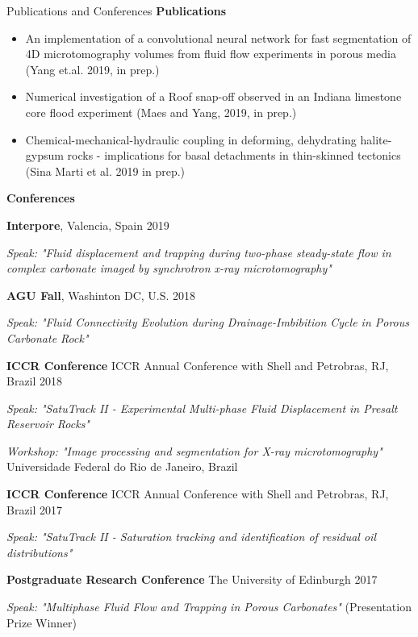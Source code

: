 \documentclass{resume} %
\newenvironment{indentpar}[1]%
  {\begin{list}{}%
          {\setlength{\leftmargin}{#1}}%
          \item[]%
  }
  {\end{list}}
\begin{document}
\begin{rSection}{Publications and Conferences}
\textbf{Publications}
\begin{indentpar}{0.5cm}
\begin{itemize}
    \item An implementation of a convolutional neural network for fast segmentation of 4D microtomography volumes from fluid flow experiments in porous media (Yang et.al. 2019, in prep.)
    \item Numerical investigation of a Roof snap-off observed in an Indiana limestone core flood experiment (Maes and Yang, 2019, in prep.)
    \item Chemical-mechanical-hydraulic coupling in deforming, dehydrating halite-gypsum rocks - implications for basal detachments in thin-skinned tectonics (Sina Marti et al. 2019 in prep.)
\end{itemize}
\end{indentpar}

\textbf{Conferences}
\begin{indentpar}{0.5cm}
\textbf{Interpore}, Valencia, Spain \hfill {2019}
\begin{indentpar}{0.5cm}
\textit {Speak: "Fluid displacement and trapping during two-phase steady-state flow in complex carbonate imaged by synchrotron x-ray microtomography"}
\end{indentpar}

\textbf{AGU Fall}, Washinton DC, U.S. \hfill {2018}
\begin{indentpar}{0.5cm}
\textit {Speak: "Fluid Connectivity Evolution during Drainage-Imbibition Cycle in Porous Carbonate Rock"}
\end{indentpar}

\textbf{ICCR Conference} ICCR Annual Conference with Shell and Petrobras, RJ, Brazil \hfill {2018}
\begin{indentpar}{0.5cm}
\textit {Speak: "SatuTrack II - Experimental Multi-phase Fluid Displacement in Presalt Reservoir Rocks"}

\textit {Workshop: "Image processing and segmentation for X-ray microtomography"} Universidade Federal do Rio de Janeiro, Brazil
\end{indentpar}

\textbf{ICCR Conference} ICCR Annual Conference with Shell and Petrobras, RJ, Brazil \hfill {2017}
\begin{indentpar}{0.5cm}
\textit {Speak: "SatuTrack II - Saturation tracking and identification of residual oil distributions"}
\end{indentpar}

\textbf{Postgraduate Research Conference} The University of Edinburgh \hfill {2017} 
\begin{indentpar}{0.5cm}
\textit {Speak: "Multiphase Fluid Flow and Trapping in Porous Carbonates"} (Presentation Prize Winner)
\end{indentpar}
\end{indentpar}
\end{rSection}
\end{document}
